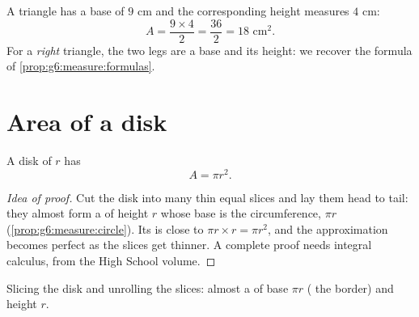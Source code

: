 \begin{example}\label{ex:g7:areas:triangle}
A triangle has a base of $9$ cm and the corresponding height measures
$4$ cm:
\[
A = \frac{9 \times 4}{2} = \frac{36}{2} = 18 \text{ cm}^2 .
\]
For a \emph{right} triangle, the two legs are a base and its height:
we recover the formula of \cref{prop:g6:measure:formulas}.
\end{example}

\section{Area of a disk}

\begin{theorem}[Disk]\label{thm:g7:areas:disk}
A disk of  $r$ has 
\[
A = \pi r^2 .
\]
\end{theorem}

\begin{proof}[Idea of proof]
Cut the disk into many thin equal slices and lay them head to tail:
they almost form a  of height $r$ whose base is  the
circumference, $\pi r$ (\cref{prop:g6:measure:circle}). Its  is
close to $\pi r \times r = \pi r^2$, and the approximation becomes
perfect as the slices get thinner. A complete proof needs integral
calculus, from the High School volume.
\end{proof}

\begin{omfigure}

{\small Slicing the disk and unrolling the slices: almost a
 of base $\pi r$ ( the border) and height $r$.}
\end{omfigure}

